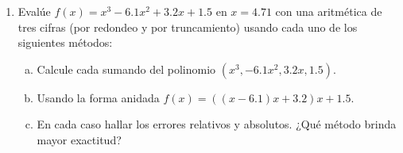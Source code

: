 \begin{frame}
\begin{enumerate}
    \item

          Evalúe
          \begin{math}
            f\left(x\right)=
            x^{3}-
            6.1x^{2}+
            3.2x+
            1.5
          \end{math}
          en $x=4.71$ con una aritmética de tres cifras (por redondeo
          y por truncamiento) usando cada uno de los siguientes
          métodos:

          \begin{enumerate}[a)]
            \item

                  Calcule cada sumando del polinomio
                  \begin{math}
                    \left(
                    x^{3},
                    -6.1x^{2},
                    3.2x,
                    1.5
                    \right)
                  \end{math}.

            \item

                  Usando la forma anidada
                  \begin{math}
                    f\left(x\right)=
                    \left(
                    \left(x-6.1\right)x+
                    3.2
                    \right)x
                    +1.5
                  \end{math}.

            \item

                  En cada caso hallar los errores relativos y
                  absolutos.
                  ¿Qué método brinda mayor exactitud?
          \end{enumerate}

          \saveenum
  \end{enumerate}
\end{frame}


